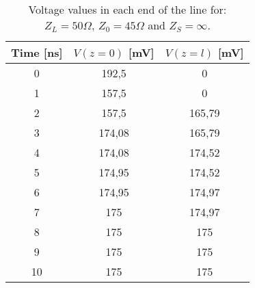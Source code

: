 \begin{table}[H]
\centering
\caption{Voltage values in each end of the line for: $Z_L = 50 \Omega$, $Z_0 = 45 \Omega$ and $Z_S = \infty$.}
\label{table1}
\begin{tabular}{|c|c|c|}
\hline
Time {[}ns{]} & $V(z=0)$ {[}mV{]} & $V(z=l)$ {[}mV{]} \\ \hline
0             & 192,5             & 0                 \\ \hline
1             & 157,5             & 0                 \\ \hline
2             & 157,5             & 165,79            \\ \hline
3             & 174,08            & 165,79            \\ \hline
4             & 174,08            & 174,52            \\ \hline
5             & 174,95            & 174,52            \\ \hline
6             & 174,95            & 174,97            \\ \hline
7             & 175               & 174,97            \\ \hline
8             & 175               & 175               \\ \hline
9             & 175               & 175               \\ \hline
10            & 175               & 175               \\ \hline
\end{tabular}
\end{table}